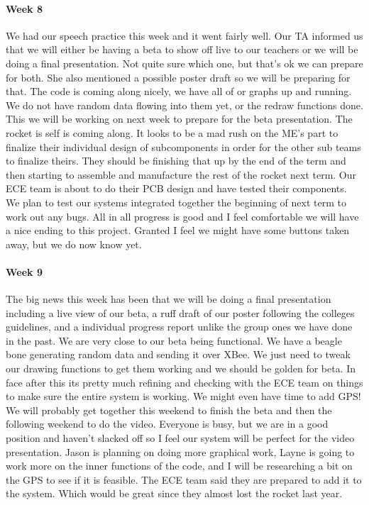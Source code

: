 \documentclass[10pt,draftclsnofoot,onecolumn,retainorgcmds]{IEEEtran}
\begin{document}
\paragraph{Week 8}
We had our speech practice this week and it went fairly well. Our TA informed us that we will either be having a beta to show off live to our teachers or we will be doing a final presentation. Not quite sure which one, but that's ok we can prepare for both. She also mentioned a possible poster draft so we will be preparing for that. The code is coming along nicely, we have all of or graphs up and running. We do not have random data flowing into them yet, or the redraw functions done. This we will be working on next week to prepare for the beta presentation. The rocket is self is coming along. It looks to be a mad rush on the ME's part to finalize their individual design of subcomponents in order for the other sub teams to finalize theirs. They should be finishing that up by the end of the term and then starting to assemble and manufacture the rest of the rocket next term. Our ECE team is about to do their PCB design and have tested their components. We plan to test our systems integrated together the beginning of next term to work out any bugs. All in all progress is good and I feel comfortable we will have a nice ending to this project. Granted I feel we might have some buttons taken away, but we do now know yet. \\
\paragraph{Week 9}
The big news this week has been that we will be doing a final presentation including a live view of our beta, a ruff draft of our poster following the colleges guidelines, and a individual progress report unlike the group ones we have done in the past. We are very close to our beta being functional. We have a beagle bone generating random data and sending it over XBee. We just need to tweak our drawing functions to get them working and we should be golden for beta. In face after this its pretty much refining and checking with the ECE team on things to make sure the entire system is working. We might even have time to add GPS! We will probably get together this weekend to finish the beta and then the following weekend to do the video. Everyone is busy, but we are in a good position and haven't slacked off so I feel our system will be perfect for the video presentation. Jason is planning on doing more graphical work, Layne is going to work more on the inner functions of the code, and I will be researching a bit on the GPS to see if it is feasible. The ECE team said they are prepared to add it to the system. Which would be great since they almost lost the rocket last year.\\
\end{document}
